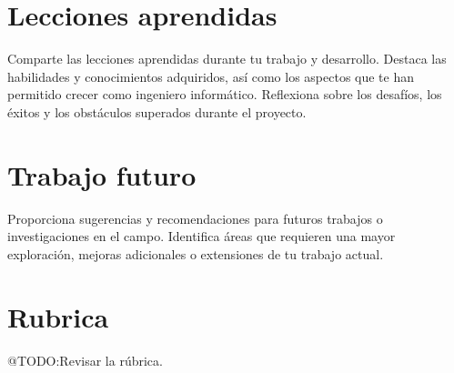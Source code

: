 \section{Lecciones aprendidas}

Comparte las lecciones aprendidas durante tu trabajo y desarrollo.
Destaca las habilidades y conocimientos adquiridos, así como los aspectos que te han permitido crecer como ingeniero
informático.
Reflexiona sobre los desafíos, los éxitos y los obstáculos superados durante el proyecto.


\section{Trabajo futuro}

Proporciona sugerencias y recomendaciones para futuros trabajos o investigaciones en el campo.
Identifica áreas que requieren una mayor exploración, mejoras adicionales o extensiones de tu trabajo actual.


\section{Rubrica}
\colorbox{color_highlight}{@TODO:Revisar la rúbrica.}

